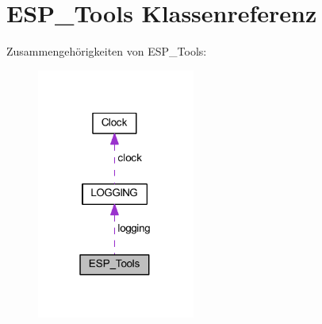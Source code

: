 \hypertarget{class_e_s_p___tools}{}\section{E\+S\+P\+\_\+\+Tools Klassenreferenz}
\label{class_e_s_p___tools}


Zusammengehörigkeiten von E\+S\+P\+\_\+\+Tools\+:\nopagebreak
\begin{figure}[H]
\begin{center}
\leavevmode
\includegraphics[width=147pt]{class_e_s_p___tools__coll__graph}
\end{center}
\end{figure}

